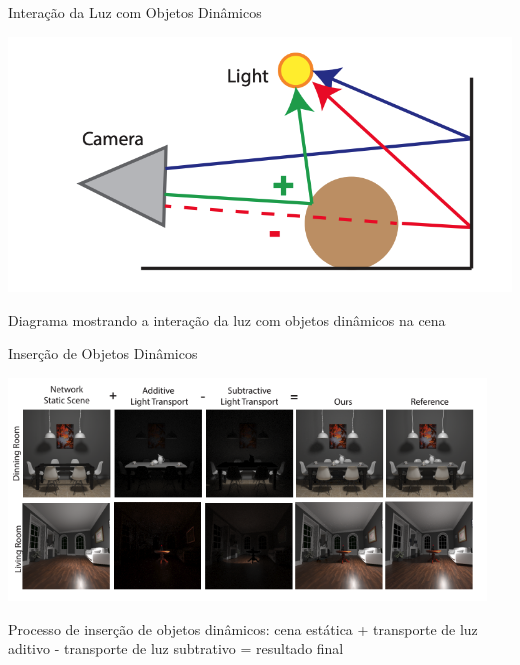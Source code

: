 \documentclass[aspectratio=169,xcolor=table]{beamer}
\begin{document}
\begin{frame}{Interação da Luz com Objetos Dinâmicos}
    \begin{center}
        \includegraphics[height=0.7\textheight]{interacao-com-luz-objetos-dinamicos}
    \end{center}
    \begin{center}
        \small{Diagrama mostrando a interação da luz com objetos dinâmicos na cena}
    \end{center}
\end{frame}

\begin{frame}{Inserção de Objetos Dinâmicos}
    \begin{center}
        \includegraphics[width=0.95\textwidth]{insercao-objetos-dinamicos}
    \end{center}
    \begin{center}
        \small{Processo de inserção de objetos dinâmicos: cena estática + transporte de luz aditivo - transporte de luz subtrativo = resultado final}
    \end{center}
\end{frame}
\end{document}
